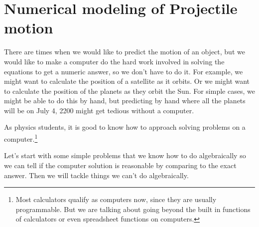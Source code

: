 \documentclass{book}
\begin{document}
\chapter[Numerical modeling I]{Numerical modeling of Projectile motion}

There are times when we would like to predict the motion of an object, but we
would like to make a computer do the hard work involved in solving the
equations to get a numeric answer, so we don't have to do it. For example, we
might want to calculate the position of a satellite as it orbits. Or we might
want to calculate the position of the planets as they orbit the Sun. For
simple cases, we might be able to do this by hand, but predicting by hand
where all the planets will be on July 4, 2200 might get tedious without a computer.

As physics students, it is good to know how to approach solving problems on a
computer.\footnote{Most calculators qualify as computers now, since they are
usually programmable. But we are talking about going beyond the built in
functions of calculators or even spreadsheet functions on computers.}

Let's start with some simple problems that we know how to do algebraically so
we can tell if the computer solution is reasonable by comparing to the exact
answer. Then we will tackle things we can't do algebraically.
\end{document}
